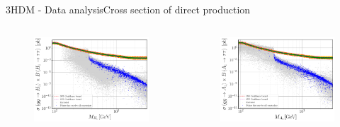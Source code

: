 \documentclass[10pt,xcolor=dvipsnames,mathserif]{beamer}
\begin{document}
\begin{frame}{3HDM - Data analysis}{Cross section of direct production}
\begin{columns}
    \begin{column}{0.48\textwidth}
    \begin{figure}[htb!]
    \centering
    \includegraphics[width=.8\textwidth]{Images/3HDM/Xsec/Xsec_1_Grey_tight.pdf}
    \end{figure}	
    \end{column}
    \begin{column}{0.48\textwidth}
    \begin{figure}[htb!]
    \centering
    \includegraphics[width=.8\textwidth]{Images/3HDM/Xsec/Xsec_2_Colourful_tight.pdf}
    \end{figure}	
    \end{column}
    
\end{columns} 

\begin{columns}
    

\end{columns}
\end{frame}
\end{document}
